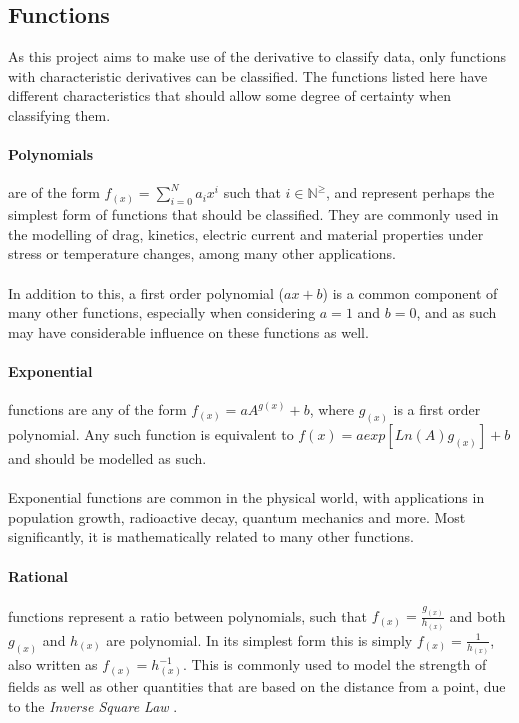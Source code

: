 \documentclass[main.tex]{subfiles}
\begin{document}
    \subsection{Functions}
      
      As this project aims to make use of the derivative to classify data, only functions with characteristic derivatives can be classified. The functions listed here have different characteristics that should allow some degree of certainty when classifying them.
      \paragraph{Polynomials} are of the form $f_{(x)}=\sum_{i=0}^{N} a_i x^i$ such that $i \in \mathbb{N}^\geq$, and represent perhaps the simplest form of functions that should be classified. They are commonly used in the modelling of drag, kinetics, electric current and material properties under stress or temperature changes, among many other applications. 
      \\\\
      In addition to this, a first order polynomial ($a x + b$) is a common component of many other functions, especially when considering $a=1$ and $b=0$, and as such may have considerable influence on these functions as well.
      \paragraph{Exponential} functions are any of the form $f_{(x)}= a A^{g(x)} + b$, where $g_{(x)}$ is a first order polynomial. Any such function is equivalent to $ f{(x)} =  a exp[  Ln(A) g_{(x)}  ] +b $ and should be modelled as such. 
      \\\\
      Exponential functions are common in the physical world, with applications in population growth, radioactive decay, quantum mechanics and more. Most significantly, it is mathematically related to many other functions.
      \paragraph{Rational} functions represent a ratio between polynomials, such that $f_{(x)}=\frac{g_{(x)}}{h_{(x)}}$ and both $g_{(x)}$ and $h_{(x)}$ are polynomial. In its simplest form this is simply $f_{(x)}=\frac{1}{h_{(x)}}$, also written as $f_{(x)}=h_{(x)}^{-1}$. This is commonly used to model the strength of fields as well as other quantities that are based on the distance from a point, due to the \textit{Inverse Square Law} \cite{}. 
\end{document}
